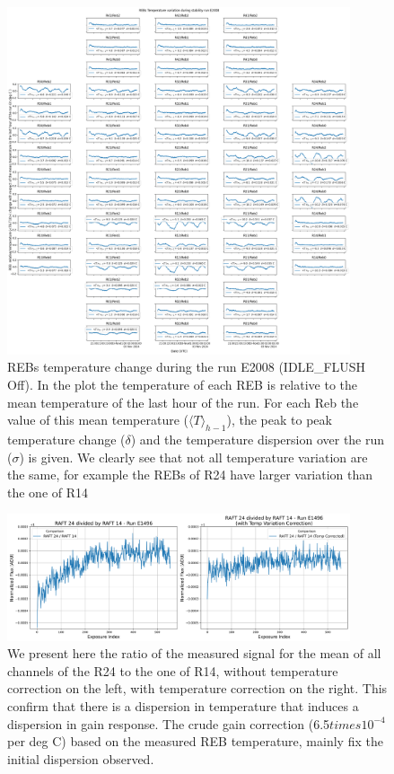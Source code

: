 \begin{figure}[ht]
\begin{centering}
\includegraphics[width=0.9\textwidth]{figures/FocalPlanTempRun_E2008.png}
\end{centering}
\caption{REBs temperature change during the run E2008 (IDLE\_FLUSH Off). In the plot the temperature of each REB is relative to the mean temperature of the last hour of the run. For each Reb the value of this mean temperature ($\langle T \rangle_{h-1}$), the peak to peak temperature change ($\delta$) and the temperature dispersion over the run ($\sigma$) is given. We clearly see that not all temperature variation are the same, for example the REBs of R24 have larger variation than the one of R14} 
\label{fig:tempE2008}
\end{figure}
\begin{figure}[ht] %
\begin{centering}
\includegraphics[width=0.9\textwidth]{figures/raft24div14.png}
\end{centering}
\caption{We present here the ratio of the measured signal for the mean of all channels of the R24 to the one of R14, without temperature correction on the left, with temperature correction on the right. This confirm that there is a  dispersion in temperature that induces a dispersion in gain response. The crude gain correction (6.5$times 10^{-4}$ per deg C) based on the measured REB temperature, mainly fix the initial dispersion observed.   }
\label{fig:R24divR14}
\end{figure}


